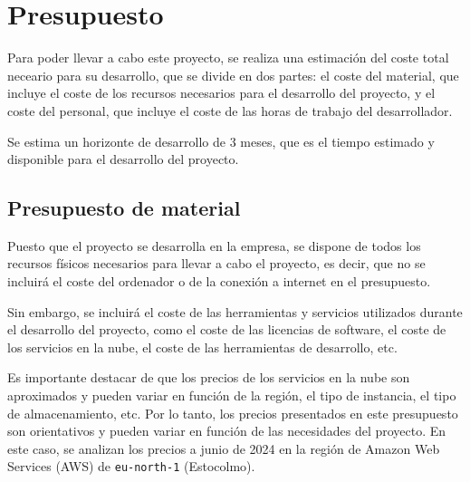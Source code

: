 \section{Presupuesto}\label{sec:presupuesto}
Para poder llevar a cabo este proyecto, se realiza una estimación del coste
total neceario para su desarrollo, que se divide en dos partes: el coste del
material, que incluye el coste de los recursos necesarios para el desarrollo del
proyecto, y el coste del personal, que incluye el coste de las horas de trabajo
del desarrollador.

Se estima un horizonte de desarrollo de 3 meses, que es el tiempo estimado y
disponible para el desarrollo del proyecto.


\subsection{Presupuesto de material}\label{subsec:pres_material}
Puesto que el proyecto se desarrolla en la empresa, se dispone de todos los
recursos físicos necesarios para llevar a cabo el proyecto, es decir, que no se
incluirá el coste del ordenador o de la conexión a internet en el presupuesto.

Sin embargo, se incluirá el coste de las herramientas y servicios utilizados
durante el desarrollo del proyecto, como el coste de las licencias de software,
el coste de los servicios en la nube, el coste de las herramientas de
desarrollo, etc.

Es importante destacar de que los precios de los servicios en la nube son
aproximados y pueden variar en función de la región, el tipo de instancia, el
tipo de almacenamiento, etc. Por lo tanto, los precios presentados en este
presupuesto son orientativos y pueden variar en función de las necesidades del
proyecto. En este caso, se analizan los precios a junio de 2024 en la región
de Amazon Web Services (AWS) de \texttt{eu-north-1} (Estocolmo).

